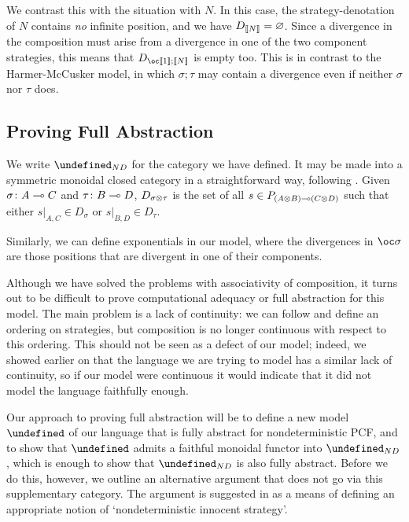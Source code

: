 \documentclass[sigplan,10pt,review]{acmart}\settopmatter{printfolios=true,printccs=false,printacmref=false}
\let\G\undefined
\let\C\undefined
\begin{document}
We contrast this with the situation with $N$.  
In this case, the strategy-denotation of $N$ contains \emph{no} infinite position, and we have $D_{\left\llbracket N\right\rrbracket}=\varnothing$.  
Since a divergence in the composition must arise from a divergence in one of the two component strategies, this means that $D_{\oc\deno{1};\deno{N}}$ is empty too.  
This is in contrast to the Harmer-McCusker model, in which $\sigma;\tau$ may contain a divergence even if neither $\sigma$ nor $\tau$ does.

\subsection{Proving Full Abstraction}

We write $\G_{ND}$ for the category we have defined.  
It may be made into a symmetric monoidal closed category in a straightforward way, following \cite{mcCHFiniteND}.  
Given $\sigma\colon A\multimap C$ and $\tau\colon B\multimap D$, $D_{\sigma\otimes\tau}$ is the set of all $s\in P_{(A\otimes B)\multimap (C\otimes D)}$ such that either $s\vert_{A,C}\in D_\sigma$ or $s\vert_{B,D}\in D_\tau$.  

Similarly, we can define exponentials in our model, where the divergences in $\oc\sigma$ are those positions that are divergent in one of their components.

Although we have solved the problems with associativity of composition, it turns out to be difficult to prove computational adequacy or full abstraction for this model.  
The main problem is a lack of continuity: we can follow \cite{mcCHFiniteND} and define an ordering on strategies, but composition is no longer continuous with respect to this ordering.  
This should not be seen as a defect of our model; indeed, we showed earlier on that the language we are trying to model has a similar lack of continuity, so if our model were continuous it would indicate that it did not model the language faithfully enough.  

Our approach to proving full abstraction will be to define a new model $\C$ of our language that is fully abstract for nondeterministic PCF, and to show that $\C$ admits a faithful monoidal functor into $\G_{ND}$, which is enough to show that $\G_{ND}$ is also fully abstract.  
Before we do this, however, we outline an alternative argument that does not go via this supplementary category.  
The argument is suggested in \cite[3.7.2]{RusssThesis} as a means of defining an appropriate notion of `nondeterministic innocent strategy'.  
\end{document}

